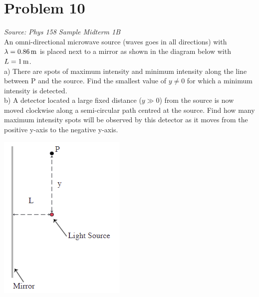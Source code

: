 \documentclass[11pt, fleqn]{article}
\begin{document}
\section*{Problem 10}
\textit{Source: Phys 158 Sample Midterm 1B}\\
An omni-directional microwave source (waves goes in all directions) with
$\lambda= 0.86\,\mathrm{m}$ is placed next to a mirror as shown in the diagram below with $L = 1\,\mathrm{m}$.\\
a) There are spots of maximum intensity and minimum intensity along the line between
P and the source. Find the smallest value of $y \neq 0$ for which a minimum intensity is detected.\\
b) A detector located a large fixed distance ($y \gg 0$) from the source is now moved
clockwise along a semi-circular path centred at the source. Find how many maximum
intensity spots will be observed by this detector as it moves from the positive y-axis to the
negative y-axis.\\
\centerline{\includegraphics{Images/CircularLight.png}}
\end{document}
